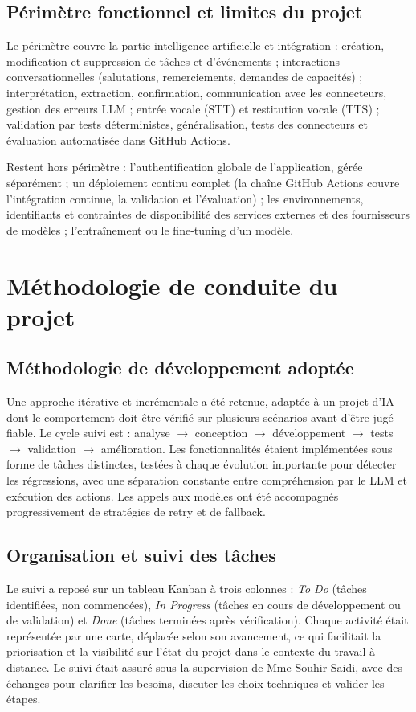 \documentclass[11pt,a4paper,openany,oneside]{report}
\begin{document}
\subsection{Périmètre fonctionnel et limites du projet}
Le périmètre couvre la partie intelligence artificielle et intégration : création, modification et suppression de tâches et d'événements ; interactions conversationnelles (salutations, remerciements, demandes de capacités) ; interprétation, extraction, confirmation, communication avec les connecteurs, gestion des erreurs LLM ; entrée vocale (STT) et restitution vocale (TTS) ; validation par tests déterministes, généralisation, tests des connecteurs et évaluation automatisée dans GitHub Actions.

Restent hors périmètre : l'authentification globale de l'application, gérée séparément ; un déploiement continu complet (la chaîne GitHub Actions couvre l'intégration continue, la validation et l'évaluation) ; les environnements, identifiants et contraintes de disponibilité des services externes et des fournisseurs de modèles ; l'entraînement ou le fine-tuning d'un modèle.

\section{Méthodologie de conduite du projet}
\subsection{Méthodologie de développement adoptée}
Une approche itérative et incrémentale a été retenue, adaptée à un projet d'IA dont le comportement doit être vérifié sur plusieurs scénarios avant d'être jugé fiable. Le cycle suivi est : analyse $\rightarrow$ conception $\rightarrow$ développement $\rightarrow$ tests $\rightarrow$ validation $\rightarrow$ amélioration. Les fonctionnalités étaient implémentées sous forme de tâches distinctes, testées à chaque évolution importante pour détecter les régressions, avec une séparation constante entre compréhension par le LLM et exécution des actions. Les appels aux modèles ont été accompagnés progressivement de stratégies de retry et de fallback.

\subsection{Organisation et suivi des tâches}\label{sec:kanban}
Le suivi a reposé sur un tableau Kanban à trois colonnes : \emph{To Do} (tâches identifiées, non commencées), \emph{In Progress} (tâches en cours de développement ou de validation) et \emph{Done} (tâches terminées après vérification). Chaque activité était représentée par une carte, déplacée selon son avancement, ce qui facilitait la priorisation et la visibilité sur l'état du projet dans le contexte du travail à distance. Le suivi était assuré sous la supervision de Mme Souhir Saidi, avec des échanges pour clarifier les besoins, discuter les choix techniques et valider les étapes.
\end{document}
